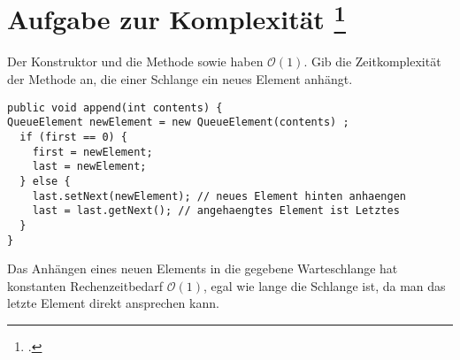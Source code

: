 \documentclass{lehramt-informatik-aufgabe}
\begin{document}

\section{Aufgabe zur Komplexität
\footcite[Seite 3]{aud:pu:2}}

\noindent
Der Konstruktor  und die Methode
 sowie  haben $\mathcal{O}(1)$.
Gib die Zeitkomplexität der Methode  an, die
einer Schlange ein neues Element anhängt.

\begin{verbatim}
public void append(int contents) {
QueueElement newElement = new QueueElement(contents) ;
  if (first == 0) {
    first = newElement;
    last = newElement;
  } else {
    last.setNext(newElement); // neues Element hinten anhaengen
    last = last.getNext(); // angehaengtes Element ist Letztes
  }
}
\end{verbatim}

\begin{liAntwort}
Das Anhängen eines neuen Elements in die gegebene Warteschlange hat
konstanten Rechenzeitbedarf $\mathcal{O}(1)$, egal wie lange die
Schlange ist, da man das letzte Element direkt ansprechen kann.
\end{liAntwort}
\end{document}
